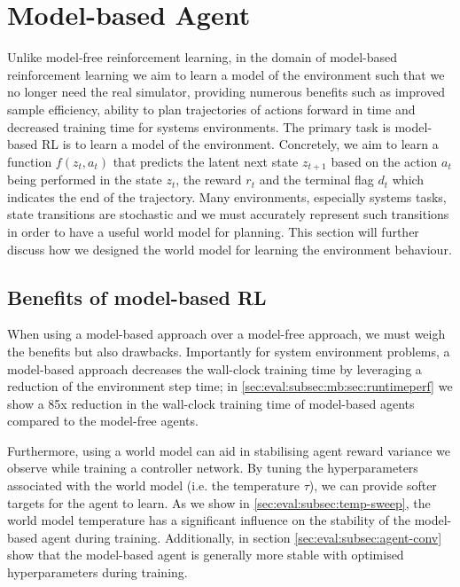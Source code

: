 \section{Model-based Agent}
\label{sec:rlopt:subsec:mb-agent}
Unlike model-free reinforcement learning, in the domain of model-based reinforcement learning we aim to learn a model of the environment such that we no longer need the real simulator, providing numerous benefits such as improved sample efficiency, ability to plan trajectories of actions forward in time and decreased training time for systems environments. The primary task is model-based RL is to learn a model of the environment. Concretely, we aim to learn a function $f(z_t, a_t)$ that predicts the latent next state $z_{t+1}$ based on the action $a_t$ being performed in the state $z_t$, the reward $r_t$ and the terminal flag $d_t$ which indicates the end of the trajectory. Many environments, especially systems tasks, state transitions are stochastic and we must accurately represent such transitions in order to have a useful world model for planning. This section will further discuss how we designed the world model for learning the environment behaviour.

\subsection{Benefits of model-based RL}
When using a model-based approach over a model-free approach, we must weigh the benefits but also drawbacks. Importantly for system environment problems, a model-based approach decreases the wall-clock training time by leveraging a reduction of the environment step time; in \autoref{sec:eval:subsec:mb:sec:runtimeperf} we show a 85x reduction in the wall-clock training time of model-based agents compared to the model-free agents.

Furthermore, using a world model can aid in stabilising agent reward variance we observe while training a controller network. By tuning the hyperparameters associated with the world model (i.e. the temperature $\tau$), we can provide softer targets for the agent to learn. As we show in \autoref{sec:eval:subsec:temp-sweep}, the world model temperature has a significant influence on the stability of the model-based agent during training. Additionally, in section \autoref{sec:eval:subsec:agent-conv} show that the model-based agent is generally more stable with optimised hyperparameters during training.

